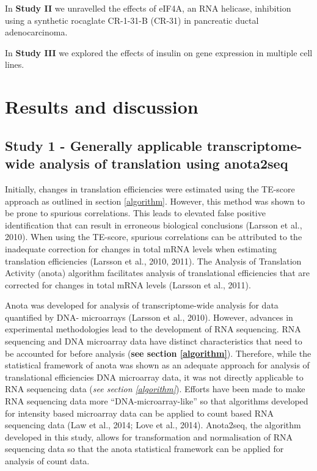 \documentclass[
  12pt,
  openany]{book}
\begin{document}
In \textbf{Study II} we unravelled the effects of eIF4A, an RNA helicase, inhibition using a synthetic rocaglate CR-1-31-B (CR-31) in pancreatic ductal adenocarcinoma.

In \textbf{Study III} we explored the effects of insulin on gene expression in multiple cell lines.

\chapter{Results and discussion}

\section{Study 1 - Generally applicable transcriptome-wide analysis of translation using anota2seq}

Initially, changes in translation efficiencies were estimated using the TE-score approach as outlined in section \ref{algorithm}. However, this method was shown to be prone to spurious correlations. This leads to elevated false positive identification that can result in erroneous biological conclusions (Larsson et al., 2010). When using the TE-score, spurious correlations can be attributed to the inadequate correction for changes in total mRNA levels when estimating translation efficiencies (Larsson et al., 2010, 2011). The Analysis of Translation Activity (anota) algorithm facilitates analysis of translational efficiencies that are corrected for changes in total mRNA levels (Larsson et al., 2011).

Anota was developed for analysis of transcriptome-wide analysis for data quantified by DNA- microarrays (Larsson et al., 2010). However, advances in experimental methodologies lead to the development of RNA sequencing. RNA sequencing and DNA microarray data have distinct characteristics that need to be accounted for before analysis (\textbf{see section \ref{algorithm}}). Therefore, while the statistical framework of anota was shown as an adequate approach for analysis of translational efficiencies DNA microarray data, it was not directly applicable to RNA sequencing data (\emph{see section \ref{algorithm}}). Efforts have been made to make RNA sequencing data more ``DNA-microarray-like'' so that algorithms developed for intensity based microarray data can be applied to count based RNA sequencing data (Law et al., 2014; Love et al., 2014). Anota2seq, the algorithm developed in this study, allows for transformation and normalisation of RNA sequencing data so that the anota statistical framework can be applied for analysis of count data.
\end{document}
